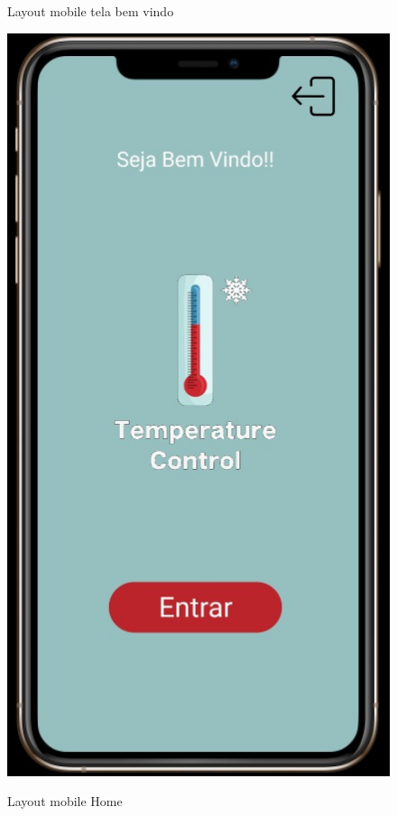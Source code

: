     \begin{figure}
        \begin{minipage}{0.5\textwidth}
            \caption{Layout mobile tela bem vindo}
            \centering
            \includegraphics[height=0.4\textheight]{img/mobile/bem_vindo.png}
            \label{fig:mobileBemVindo}
        \end{minipage}%
        \begin{minipage}{0.5\textwidth}
            \caption{Layout mobile Home}
            \centering

\end{minipage}
\end{figure}
